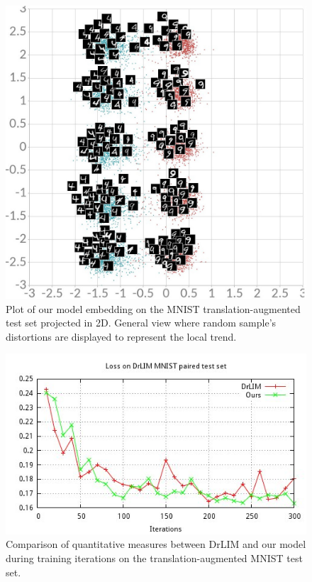 \documentclass[a4paper,12pt]{report}
\begin{document}
\begin{figure}
    \centering
    \includegraphics[width=\textwidth]{thesis_figures/mnist_cl2d2.jpg}
    \caption{Plot of our model embedding on the MNIST translation-augmented test set projected in 2D. General view where random sample's distortions are displayed to represent the local trend.}
    \label{fig:mnist_cl2d_2}
\end{figure}

\begin{figure}[h]
    \begin{center}
        \includegraphics{thesis_figures/final_loss_test2bv7.jpg}
    \end{center}
    \caption{Comparison of quantitative measures between DrLIM and our model during training iterations on the translation-augmented MNIST test set.}
    \label{fig:loss_mnist_test_common}
\end{figure}
\end{document}
